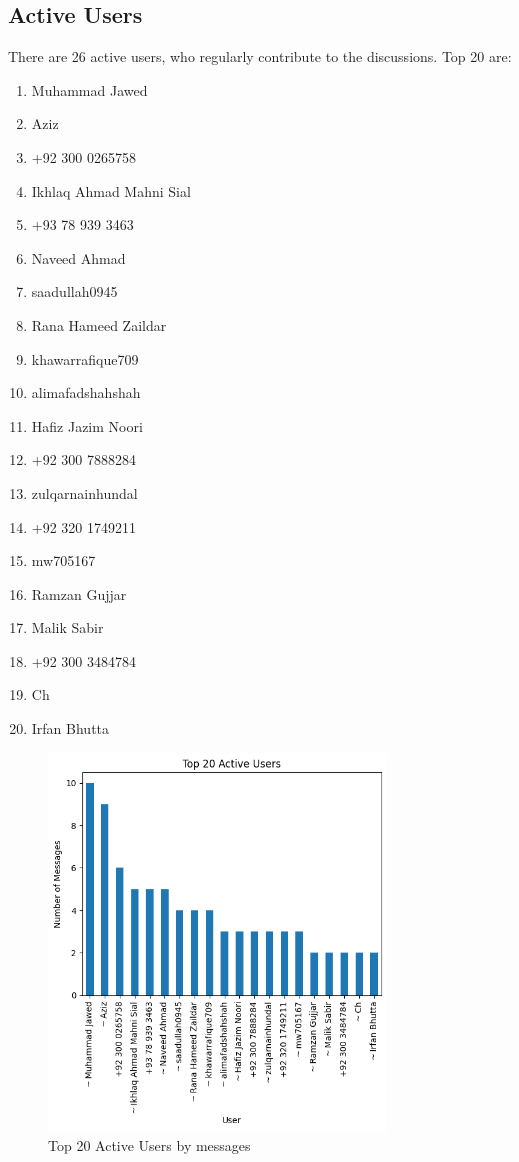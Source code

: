 \documentclass[12pt]{article}
\begin{document}
\subsection{Active Users}
There are 26 active users, who regularly contribute to the discussions. Top 20 are:
\begin{enumerate}
  \item Muhammad Jawed
  \item Aziz
  \item +92 300 0265758
  \item Ikhlaq Ahmad Mahni Sial
  \item +93 78 939 3463
  \item Naveed Ahmad
  \item saadullah0945
  \item Rana Hameed Zaildar
  \item khawarrafique709
  \item alimafadshahshah
  \item Hafiz Jazim Noori
  \item +92 300 7888284
  \item zulqarnainhundal
  \item +92 320 1749211
  \item mw705167
  \item Ramzan Gujjar
  \item Malik Sabir
  \item +92 300 3484784
  \item Ch
  \item Irfan Bhutta
\end{enumerate}
\begin{figure}[H]
  \centering
  \includegraphics[width=0.8\textwidth]{img/active_users.png}
  \caption{Top 20 Active Users by messages}
\end{figure}
\end{document}
